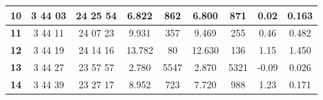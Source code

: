 \documentclass[12pt]{article}
\begin{document}
\begin{table}[H]
{\begin{tabular}{|c|c|c|c|c|c|c|c|c|}
        \textbf{10}   & 3  44  03                                                        & 24  25  54                                                         & 6.822      & 862                                                        & 6.800      & 871                                                        & 0.02         & 0.163                                                            \\ \hline
        \textbf{11}   & 3  44  11                                                        & 24  07  23                                                         & 9.931      & 357                                                        & 9.469      & 255                                                        & 0.46         & 0.482                                                            \\ \hline
        \textbf{12}   & 3  44  19                                                        & 24  14  16                                                         & 13.782     & 80                                                         & 12.630     & 136                                                        & 1.15         & 1.450                                                            \\ \hline
        \textbf{13}   & 3  44  27                                                        & 23  57  57                                                         & 2.780      & 5547                                                       & 2.870      & 5321                                                       & -0.09        & 0.026                                                            \\ \hline
        \textbf{14}   & 3  44  39                                                        & 23  27  17                                                         & 8.952      & 723                                                        & 7.720      & 988                                                        & 1.23         & 0.171                                                            \\ \hline
        \end{tabular}
    }
    \label{tab:1}
\end{table}
\end{document}
